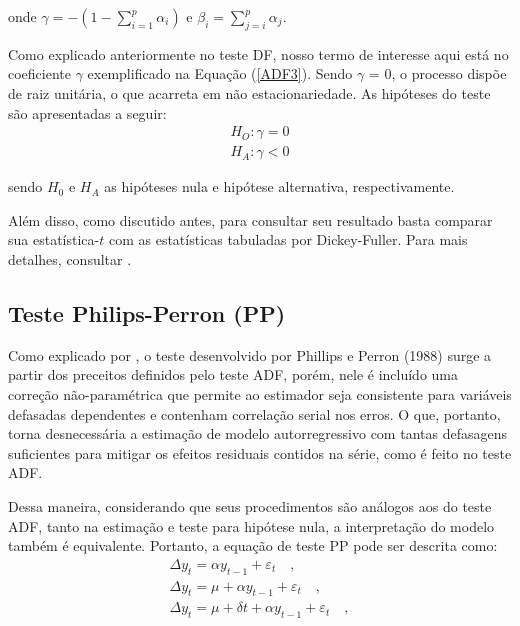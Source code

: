 \noindent onde $\gamma = - (1 - \sum^p_{i=1} \alpha_i)$ e $\beta_i = \sum^{p}_{j=i} \alpha_j$.

Como explicado anteriormente no teste DF, nosso termo de interesse aqui está no coeficiente $\gamma$ exemplificado na Equação (\ref{ADF3}). Sendo $\gamma$ = 0, o processo dispõe de raiz unitária, o que acarreta em não estacionariedade. As hipóteses do teste são apresentadas a seguir:
\begin{align*} \label{hipoteses}
    H_O: \gamma = 0 \\
    H_A: \gamma < 0
\end{align*}

\noindent sendo $H_0$ e $H_A$ as hipóteses nula e hipótese alternativa, respectivamente.

Além disso, como discutido antes, para consultar seu resultado basta comparar sua estatística-$t$ com as estatísticas tabuladas por Dickey-Fuller. Para mais detalhes, consultar .

\subsection{Teste Philips-Perron (PP)}

Como explicado por , o teste desenvolvido por Phillips e Perron (1988) surge a partir dos preceitos definidos pelo teste ADF, porém, nele é incluído uma correção não-paramétrica que permite ao estimador seja consistente para variáveis defasadas dependentes e contenham correlação serial nos erros. O que, portanto, torna desnecessária a estimação de modelo autorregressivo com tantas defasagens suficientes para mitigar os efeitos residuais contidos na série, como é feito no teste ADF.

Dessa maneira, considerando que seus procedimentos são análogos aos do teste ADF, tanto na estimação e teste para hipótese nula, a interpretação do modelo também é equivalente. Portanto, a equação de teste PP pode ser descrita como:
\begin{equation}
    \begin{split}
        \Delta y_t = \alpha y_{t-1} + \varepsilon_t \quad, \\
        \Delta y_t = \mu + \alpha y_{t-1} + \varepsilon_t \quad, \\
        \Delta y_t = \mu + \delta t + \alpha y_{t-1} + \varepsilon_t \quad,
    \end{split}
\end{equation}


